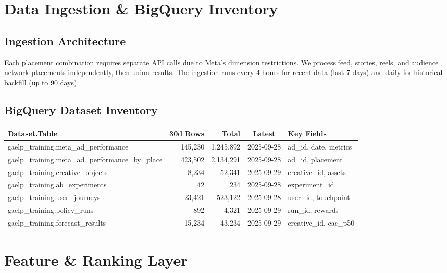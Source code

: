 \documentclass[11pt,a4paper]{report}
\begin{document}
\chapter{Data Ingestion \& BigQuery Inventory}

\section{Ingestion Architecture}

Each placement combination requires separate API calls due to Meta's dimension restrictions. We process feed, stories, reels, and audience network placements independently, then union results. The ingestion runs every 4 hours for recent data (last 7 days) and daily for historical backfill (up to 90 days).

\section{BigQuery Dataset Inventory}

\begin{table}[H]
\centering
\small
\begin{tabularx}{\textwidth}{X|r|r|c|l}
\toprule
\textbf{Dataset.Table} & \textbf{30d Rows} & \textbf{Total} & \textbf{Latest} & \textbf{Key Fields} \\
\midrule
gaelp\_training.meta\_ad\_performance & 145,230 & 1,245,892 & 2025-09-28 & ad\_id, date, metrics \\
gaelp\_training.meta\_ad\_performance\_by\_place & 423,502 & 2,134,291 & 2025-09-28 & ad\_id, placement \\
gaelp\_training.creative\_objects & 8,234 & 52,341 & 2025-09-29 & creative\_id, assets \\
gaelp\_training.ab\_experiments & 42 & 234 & 2025-09-28 & experiment\_id \\
gaelp\_training.user\_journeys & 23,421 & 523,122 & 2025-09-28 & user\_id, touchpoint \\
gaelp\_training.policy\_runs & 892 & 4,321 & 2025-09-29 & run\_id, rewards \\
gaelp\_training.forecast\_results & 15,234 & 43,234 & 2025-09-29 & creative\_id, cac\_p50 \\
\bottomrule
\end{tabularx}
\end{table}

\chapter{Feature \& Ranking Layer}
\end{document}
